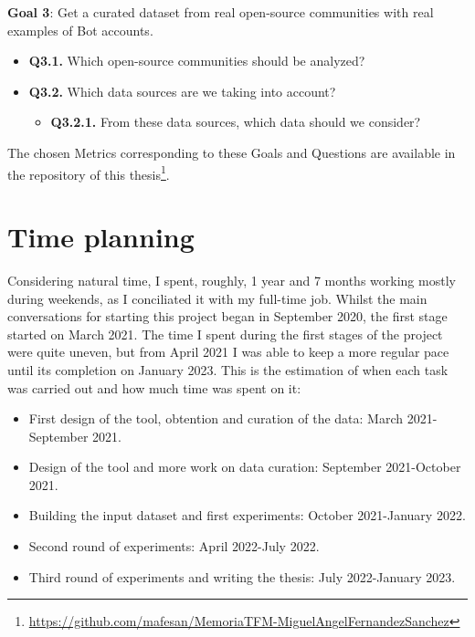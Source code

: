 \documentclass[a4paper, 12pt]{book}
\begin{document}
\textbf{Goal 3}: Get a curated dataset from real open-source communities with real examples of Bot accounts.

\begin{itemize}
    \item \textbf{Q3.1.} Which open-source communities should be analyzed?
    \item \textbf{Q3.2.} Which data sources are we taking into account?
    \begin{itemize}
        \item \textbf{Q3.2.1.} From these data sources, which data should we consider?
    \end{itemize}
\end{itemize}

The chosen Metrics corresponding to these Goals and Questions are available in the repository of this thesis\footnote{\url{https://github.com/mafesan/MemoriaTFM-MiguelAngelFernandezSanchez}}.

\section{Time planning}
\label{sec:time-planning}


Considering natural time, I spent, roughly, 1 year and 7 months working mostly 
during weekends, as I conciliated it with my full-time job. Whilst the main conversations for starting this project began in September 2020, the first stage started on March 2021. The time I spent during the first stages of the project were quite uneven, but from April 2021 I was able to keep a more regular pace until its completion on January 2023. This is the estimation of when each task was carried out and how much time was spent on it:

\begin{itemize}
\item First design of the tool, obtention and curation of the data: March 2021-September 2021.
\item Design of the tool and more work on data curation: September 2021-October 2021.
\item Building the input dataset and first experiments: October 2021-January 2022.
\item Second round of experiments: April 2022-July 2022.
\item Third round of experiments and writing the thesis: July 2022-January 2023.
\end{itemize}
\end{document}
